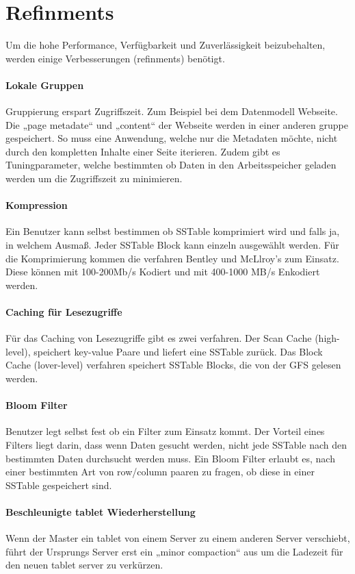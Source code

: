 \section{Refinments}
Um die hohe Performance, Verfügbarkeit und Zuverlässigkeit beizubehalten, werden einige Verbesserungen (refinments) benötigt.

\paragraph{Lokale Gruppen}
Gruppierung erspart Zugriffszeit. Zum Beispiel bei dem Datenmodell Webseite. Die „page metadate“ und „content“ der Webseite werden in einer anderen gruppe gespeichert. So muss eine Anwendung, welche nur die Metadaten möchte, nicht durch den kompletten Inhalte einer Seite iterieren.
Zudem gibt es Tuningparameter, welche bestimmten ob Daten in den Arbeitsspeicher geladen werden um die Zugriffszeit zu minimieren.

\paragraph{Kompression}
Ein Benutzer kann selbst bestimmen ob SSTable komprimiert wird und falls ja, in welchem Ausmaß. Jeder SSTable Block kann einzeln ausgewählt werden. Für die Komprimierung kommen die  verfahren Bentley und McLlroy’s zum Einsatz. Diese können mit 100-200Mb/s Kodiert und mit 400-1000 MB/s Enkodiert werden.

\paragraph{Caching für Lesezugriffe}
Für das Caching von Lesezugriffe gibt es zwei verfahren. Der Scan Cache (high-level), speichert key-value Paare und liefert eine SSTable zurück. Das Block Cache (lover-level) verfahren speichert SSTable Blocks, die von der GFS gelesen werden.

\paragraph{Bloom Filter}
Benutzer legt selbst fest ob ein Filter zum Einsatz kommt. Der Vorteil eines Filters liegt darin, dass wenn Daten gesucht werden, nicht jede SSTable nach den bestimmten Daten durchsucht werden muss. Ein Bloom Filter erlaubt es, nach einer bestimmten Art von row/column paaren zu fragen, ob diese in einer SSTable gespeichert sind.

\paragraph{Beschleunigte tablet Wiederherstellung}
Wenn der Master ein tablet von einem Server zu einem anderen Server verschiebt, führt der Ursprungs Server erst ein „minor compaction“ aus um die Ladezeit für den neuen tablet server zu verkürzen.

